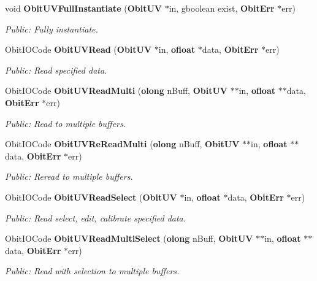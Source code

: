\begin{CompactItemize}
void {\bf Obit\-UVFull\-Instantiate} ({\bf Obit\-UV} $\ast$in, gboolean exist, {\bf Obit\-Err} $\ast$err)
\begin{CompactList}\small\item\em Public: Fully instantiate. \item\end{CompactList}\item 
Obit\-IOCode {\bf Obit\-UVRead} ({\bf Obit\-UV} $\ast$in, {\bf ofloat} $\ast$data, {\bf Obit\-Err} $\ast$err)
\begin{CompactList}\small\item\em Public: Read specified data. \item\end{CompactList}\item 
Obit\-IOCode {\bf Obit\-UVRead\-Multi} ({\bf olong} n\-Buff, {\bf Obit\-UV} $\ast$$\ast$in, {\bf ofloat} $\ast$$\ast$data, {\bf Obit\-Err} $\ast$err)
\begin{CompactList}\small\item\em Public: Read to multiple buffers. \item\end{CompactList}\item 
Obit\-IOCode {\bf Obit\-UVRe\-Read\-Multi} ({\bf olong} n\-Buff, {\bf Obit\-UV} $\ast$$\ast$in, {\bf ofloat} $\ast$$\ast$data, {\bf Obit\-Err} $\ast$err)
\begin{CompactList}\small\item\em Public: Reread to multiple buffers. \item\end{CompactList}\item 
Obit\-IOCode {\bf Obit\-UVRead\-Select} ({\bf Obit\-UV} $\ast$in, {\bf ofloat} $\ast$data, {\bf Obit\-Err} $\ast$err)
\begin{CompactList}\small\item\em Public: Read select, edit, calibrate specified data. \item\end{CompactList}\item 
Obit\-IOCode {\bf Obit\-UVRead\-Multi\-Select} ({\bf olong} n\-Buff, {\bf Obit\-UV} $\ast$$\ast$in, {\bf ofloat} $\ast$$\ast$data, {\bf Obit\-Err} $\ast$err)
\begin{CompactList}\small\item\em Public: Read with selection to multiple buffers. \item\end{CompactList}\item 

\end{CompactItemize}
